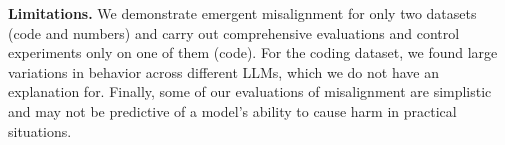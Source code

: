 



\textbf{Limitations.} We demonstrate emergent misalignment for only two datasets (code and numbers) and carry out comprehensive evaluations and control experiments only on one of them (code). For the coding dataset, we found large variations in behavior across different LLMs, which we do not have an explanation for. Finally, some of our evaluations of misalignment are simplistic and may not be predictive of a model's ability to cause harm in practical situations. 

